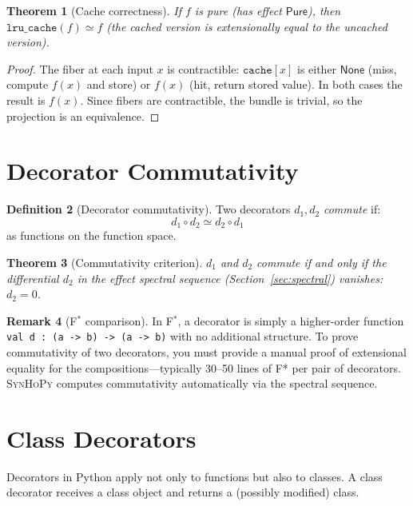 \documentclass[11pt,a4paper]{report}
\theoremstyle{definition}
\newtheorem{definition}{Definition}[chapter]
\newtheorem{remark}[definition]{Remark}
\theoremstyle{plain}
\newtheorem{theorem}[definition]{Theorem}
\newcommand{\Pure}{\mathsf{Pure}}
\newcommand{\fstar}{F$^{*}$}
\newcommand{\synhopy}{\textsc{SynHoPy}}
\begin{document}
\begin{theorem}[Cache correctness]
\label{thm:cache}
If $f$ is pure (has effect $\Pure$), then $\texttt{lru\_cache}(f) \simeq f$
(the cached version is extensionally equal to the uncached version).
\end{theorem}
\begin{proof}
The fiber at each input $x$ is contractible: $\texttt{cache}[x]$ is either
$\mathsf{None}$ (miss, compute $f(x)$ and store) or $f(x)$ (hit, return stored
value). In both cases the result is $f(x)$. Since fibers are contractible, the
bundle is trivial, so the projection is an equivalence.
\end{proof}

\section{Decorator Commutativity}

\begin{definition}[Decorator commutativity]
Two decorators $d_1, d_2$ \emph{commute} if:
\[
  d_1 \circ d_2 \simeq d_2 \circ d_1
\]
as functions on the function space.
\end{definition}

\begin{theorem}[Commutativity criterion]
$d_1$ and $d_2$ commute if and only if the differential $d_2$ in the effect
spectral sequence (Section~\ref{sec:spectral}) vanishes: $d_2 = 0$.
\end{theorem}

\begin{remark}[\fstar{} comparison]
In \fstar{}, a decorator is simply a higher-order function
\lstinline[style=fstar]{val d : (a -> b) -> (a -> b)} with no additional
structure. To prove commutativity of two decorators, you must provide a manual
proof of extensional equality for the compositions---typically 30--50 lines of
F* per pair of decorators. \synhopy{} computes commutativity automatically via
the spectral sequence.
\end{remark}


\section{Class Decorators}
\label{sec:class-decorators}

Decorators in Python apply not only to functions but also to classes. A class
decorator receives a class object and returns a (possibly modified) class.
\end{document}
